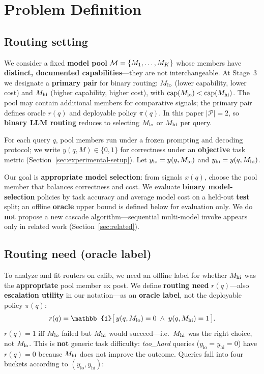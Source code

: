 \section{Problem Definition}
\label{sec:problem}

\subsection{Routing setting}
\label{sec:routing-setting}

We consider a fixed \textbf{model pool} $\mathcal{M}=\{M_1,\ldots,M_K\}$ whose members have \textbf{distinct, documented capabilities}---they are not interchangeable.
At Stage~3 we designate a \textbf{primary pair} for binary routing: $M_{\mathrm{lo}}$ (lower capability, lower cost) and $M_{\mathrm{hi}}$ (higher capability, higher cost), with $\mathrm{cap}(M_{\mathrm{lo}})<\mathrm{cap}(M_{\mathrm{hi}})$.
The pool may contain additional members for comparative signals; the primary pair defines oracle $r(q)$ and deployable policy $\pi(q)$.
In this paper $|\mathcal{P}|=2$, so \textbf{binary LLM routing} reduces to selecting $M_{\mathrm{lo}}$ or $M_{\mathrm{hi}}$ per query.

For each query $q$, pool members run under a frozen prompting and decoding protocol; we write $y(q,M)\in\{0,1\}$ for correctness under an \textbf{objective} task metric (Section~\ref{sec:experimental-setup}).
Let $y_{\mathrm{lo}}=y(q,M_{\mathrm{lo}})$ and $y_{\mathrm{hi}}=y(q,M_{\mathrm{hi}})$.

Our goal is \textbf{appropriate model selection}: from signals $x(q)$, choose the pool member that balances correctness and cost.
We evaluate \textbf{binary model-selection} policies by task accuracy and average model cost on a held-out \textbf{test} split; an offline \textbf{oracle} upper bound is defined below for evaluation only.
We do \textbf{not} propose a new cascade algorithm---sequential multi-model invoke appears only in related work (Section~\ref{sec:related}).

\subsection{Routing need (oracle label)}
\label{sec:routing-need}

To analyze and fit routers on calib, we need an offline label for whether $M_{\mathrm{hi}}$ was the \textbf{appropriate} pool member ex post.
We define \textbf{routing need} $r(q)$---also \textbf{escalation utility} in our notation---as an \textbf{oracle label}, not the deployable policy $\pi(q)$:
\begin{equation}
  r(q) = \mathbb{1}\big[\, y(q,\Mlo)=0 \;\wedge\; y(q,\Mhi)=1 \,\big].
  \label{eq:routing-need}
\end{equation}
$r(q)=1$ iff $M_{\mathrm{lo}}$ failed but $M_{\mathrm{hi}}$ would succeed---i.e.\ $M_{\mathrm{hi}}$ was the right choice, not $M_{\mathrm{lo}}$.
This is \textbf{not} generic task difficulty: \emph{too\_hard} queries ($y_{\mathrm{lo}}=y_{\mathrm{hi}}=0$) have $r(q)=0$ because $M_{\mathrm{hi}}$ does not improve the outcome.
Queries fall into four buckets according to $(y_{\mathrm{lo}},y_{\mathrm{hi}})$:


